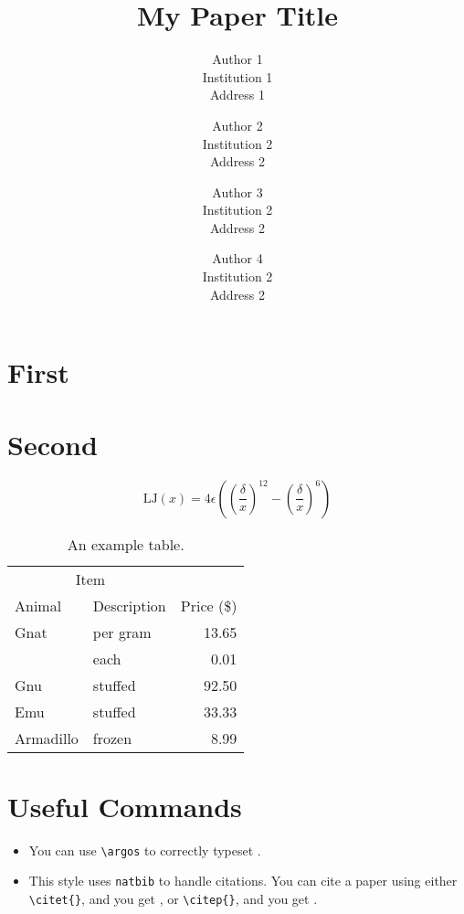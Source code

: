 \documentclass[twocolumn]{nestpaper}
\title{My Paper Title}
\author{
  Author 1\\
  Institution 1 \\
  Address 1 \\
  \email{author1@institution1.edu}
  \and
  Author 2\\
  Institution 2 \\
  Address 2 \\
  \email{author2@institution2.edu}
  \and
  Author 3\\
  Institution 2 \\
  Address 2 \\
  \email{author2@institution2.edu}
  \and
  Author 4\\
  Institution 2 \\
  Address 2 \\
  \email{author2@institution2.edu}}
\begin{document}

\maketitle

\begin{abstract}
\lipsum[1]
\end{abstract}

\section{First}
\lipsum[1-6]

\section{Second}
\lipsum[9]
\begin{equation}
  \text{LJ}(x) = 4\epsilon\left(\left(\frac{\delta}{x}\right)^{12} - \left(\frac{\delta}{x}\right)^6\right)
\end{equation}

\lipsum[10]

\begin{table}[t]
  \centering
  \caption{An example table.}
  \begin{tabular}{@{}llr@{}}
    \toprule
    \multicolumn{2}{c}{Item} \\
    \cmidrule(r){1-2}
    Animal    & Description & Price (\$)\\
    \midrule
    Gnat      & per gram    & 13.65     \\
              & each        & 0.01      \\
    Gnu       & stuffed     & 92.50     \\
    Emu       & stuffed     & 33.33     \\
    Armadillo & frozen      & 8.99      \\
    \bottomrule
  \end{tabular}
\end{table}

\section{Useful Commands}
\begin{itemize}
\item You can use \verb|\argos| to correctly typeset \argos.
\item This style uses \verb|natbib| to handle citations. You can cite a paper using either \verb|\citet{}|, and you get \citet{Pinciroli:SI2012}, or \verb|\citep{}|, and you get \citep{Pinciroli:SI2012}.
\end{itemize}
\end{document}
